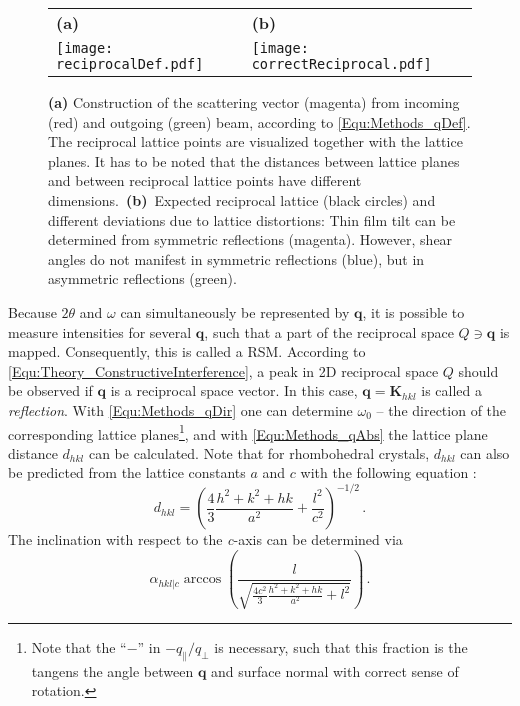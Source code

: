 \begin{figure}
    \centering
    \begin{tabular}{ll}
        \textbf{(a)}&\textbf{(b)}\\
        \texttt{[image: reciprocalDef.pdf]}
        &\texttt{[image: correctReciprocal.pdf]}
    \end{tabular}
    \caption{\textbf{(a)} Construction of the scattering vector (magenta) from incoming (red) and outgoing (green) beam, according to \eqref{Equ:Methods_qDef}.
    The reciprocal lattice points are visualized together with the lattice planes.
    It has to be noted that the distances between lattice planes and between reciprocal lattice points have different dimensions.\ 
    \textbf{(b)}~Expected reciprocal lattice (black circles) and different deviations due to lattice distortions:
    Thin film tilt can be determined from symmetric reflections (magenta).
    However, shear angles do not manifest in symmetric reflections (blue), but in asymmetric reflections (green).}
    \label{Fig:Methods_qDef}
\end{figure} 
Because $2\theta$ and $\omega$ can simultaneously be represented by $\mathbf{q}$, it is possible to measure intensities for several $\mathbf{q}$, such that a part of the reciprocal space $Q\ni\mathbf{q}$ is mapped.
Consequently, this is called a \gls{RSM}.
According to \eqref{Equ:Theory_ConstructiveInterference}, a peak in 2D reciprocal space $Q$ should be observed if $\mathbf{q}$ is a reciprocal space vector.
In this case, $\mathbf{q}=\mathbf{K}_{hkl}$ is called a \emph{reflection}.
With \eqref{Equ:Methods_qDir} one can determine $\omega_0$ -- the direction of the corresponding lattice planes\footnote{
    Note that the \enquote{$-$} in $-q_\parallel/q_\perp$ is necessary, such that this fraction is the tangens the angle between $\mathbf{q}$ and surface normal with correct sense of rotation. 
}, and with \eqref{Equ:Methods_qAbs} the lattice plane distance $d_{hkl}$ can be calculated.
Note that for rhombohedral crystals, $d_{hkl}$ can also be predicted from the lattice constants $a$ and $c$ with the following equation \cite{grundmann2018}:
\begin{equation}
    d_{hkl}=\left(
        \frac{4}{3}\frac{h^2+k^2+hk}{a^2}
        +\frac{l^2}{c^2}
    \right)^{-1/2}\,.
    \label{Equ:Methods_dhkl}
\end{equation}
The inclination with respect to the \textit{c}-axis can be determined via \cite{grundmann2020b}
\begin{equation}
    \alpha_{hkl|c}
    \arccos\left(
        \frac{l}{\sqrt{
            \frac{4c^2}{3}\frac{h^2+k^2+hk}{a^2}+l^2
        }}
    \right)\,.
    \label{Equ:Methods_angleWRTc}
\end{equation}


